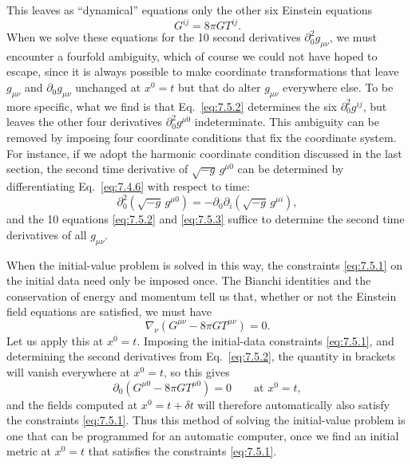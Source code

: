 This leaves as ``dynamical'' equations only the other six Einstein equations
\begin{equation}
  G^{ij}=8\pi G T^{ij}.
  \tag{7.5.2}\label{eq:7.5.2}
\end{equation}
When we solve these equations for the 10 second derivatives
\(\partial_0^2g_{\mu\nu}\), we must encounter a fourfold ambiguity, which of
course we could not have hoped to escape, since it is always possible to make
coordinate transformations that leave \(g_{\mu\nu}\) and
\(\partial_0g_{\mu\nu}\) unchanged at \(x^0=t\) but that do alter
\(g_{\mu\nu}\) everywhere else. To be more specific, what we find is that
Eq.~\eqref{eq:7.5.2} determines the six \(\partial_0^2g^{ij}\), but leaves
the other four derivatives \(\partial_0^2g^{\mu0}\) indeterminate. This
ambiguity can be removed by imposing four coordinate conditions that fix the
coordinate system. For instance, if we adopt the harmonic coordinate
condition discussed in the last section, the second time derivative of
\(\sqrt{-g}\,g^{\mu0}\) can be determined by differentiating
Eq.~\eqref{eq:7.4.6} with respect to time:
\begin{equation}
  \partial_0^2\left(\sqrt{-g}\,g^{\mu0}\right)
  =
  -\partial_0\partial_i\left(\sqrt{-g}\,g^{\mu i}\right),
  \tag{7.5.3}\label{eq:7.5.3}
\end{equation}
and the 10 equations \eqref{eq:7.5.2} and \eqref{eq:7.5.3} suffice to
determine the second time derivatives of all \(g_{\mu\nu}\).

When the initial-value problem is solved in this way, the constraints
\eqref{eq:7.5.1} on the initial data need only be imposed once. The Bianchi
identities and the conservation of energy and momentum tell us that, whether
or not the Einstein field equations are satisfied, we must have
\[
  \nabla_\nu\left(G^{\mu\nu}-8\pi G T^{\mu\nu}\right)=0.
\]
Let us apply this at \(x^0=t\). Imposing the initial-data constraints
\eqref{eq:7.5.1}, and determining the second derivatives from
Eq.~\eqref{eq:7.5.2}, the quantity in brackets will vanish everywhere at
\(x^0=t\), so this gives
\[
  \partial_0\left(G^{\mu0}-8\pi G T^{\mu0}\right)=0
  \qquad\text{at }x^0=t,
\]
and the fields computed at \(x^0=t+\delta t\) will therefore automatically
also satisfy the constraints \eqref{eq:7.5.1}. Thus this method of solving
the initial-value problem is one that can be programmed for an automatic
computer, once we find an initial metric at \(x^0=t\) that satisfies the
constraints \eqref{eq:7.5.1}.
